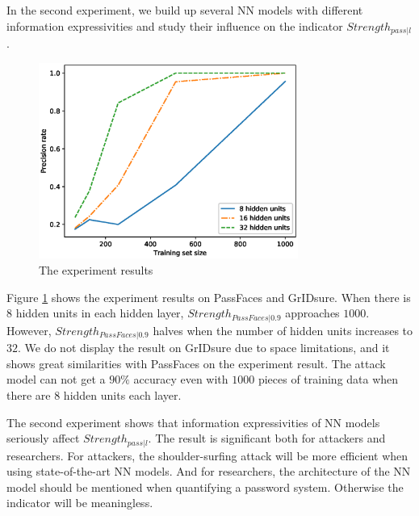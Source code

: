 \documentclass{article}
\begin{document}
  In the second experiment, we build up several NN models with different information expressivities and study 
  their influence on the indicator $Strength_{pass|l}$.
  \begin{figure}[htb]
    \centering
    \includegraphics[width=8.5cm]{passfaces.eps}
    \caption{The experiment results}
    \label{fig:results2}
  \end{figure}
  
  Figure \ref{fig:results2} shows the experiment results on PassFaces and GrIDsure. When there is $8$ hidden 
  units in each hidden layer, $Strength_{PassFaces|0.9}$ approaches $1000$. However, $Strength_{PassFaces|0.9}$ halves 
  when the number of hidden units increases to $32$. We do not display the result on GrIDsure due to space 
  limitations, and it shows great similarities with PassFaces on the experiment result. The attack model can not 
  get a $90\%$ accuracy even with $1000$ pieces of training data when there are $8$ hidden units each layer.
  
  The second experiment shows that information expressivities of NN models seriously affect $Strength_{pass|l}$. 
  The result is significant both for attackers and researchers. For attackers, the shoulder-surfing attack will be 
  more efficient when using state-of-the-art NN models. And for researchers, the architecture of the NN model should 
  be mentioned when quantifying a password system. Otherwise the indicator will be meaningless.
  
\end{document}
